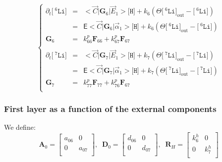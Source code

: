 \documentclass[aps,onecolumn,11pt]{revtex4}
\newcommand{\mychem}[1]{\mathtt{#1}}
\newcommand{\myconc}[1]{\big[#1\big]}
\newcommand{\spLi}[1]{{\!~^{#1}\mychem{Li}}}
\newcommand{\Li}[1]{\myconc{\spLi{#1}}}
\newcommand{\spproton}{\mychem{H}}
\newcommand{\proton}{\myconc{\spproton}}
\newcommand{\myout}[1]{{#1}_{\mathrm{out}}}
\newcommand{\LiOut}[1]{\myout{\Li{#1}}}
\newcommand{\mymat}[1]{{\bm{#1}}}
\begin{document}
\begin{equation}
\left\lbrace
\begin{array}{rcl}
	\partial_t \Li{6} & = & <\vec{C}|\mymat{G}_6|\vec{E}_1> \proton+ k_6\left(\Theta \LiOut{6} - \Li{6}\right)\\
	& = & \mathsf{E} <\vec{C}|\mymat{G}_6|\vec{\alpha}_1> \proton+ k_6\left(\Theta \LiOut{6} - \Li{6}\right)\\
	\mymat{G}_6 &= & k^p_{66} \mymat{F}_{66} + k^p_{67}\mymat{F}_{67} 
	\\
	\\
	\partial_t \Li{7} & = & <\vec{C}|\mymat{G}_7|\vec{E}_1> \proton + k_7\left(\Theta \LiOut{7} - \Li{7}\right)\\
		& = & \mathsf{E} <\vec{C}|\mymat{G}_7|\vec{\alpha}_1> \proton+ k_7\left(\Theta \LiOut{7} - \Li{7}\right)\\
	\mymat{G}_7 & = & k^p_{77} \mymat{F}_{77} + k^p_{76}\mymat{F}_{67} 
	\\
\end{array}
\right.
\end{equation}


\subsubsection{First layer as a function of the external components}
We define:
\begin{equation}
\mymat{A}_0 =\begin{bmatrix}
a_{06} & 0 \\
0 & a_{07} \\
\end{bmatrix},\;\;
\mymat{D}_0 = 
\begin{bmatrix}
d_{06} & 0 \\
0 & d_{07} \\
\end{bmatrix},\;\;
\mymat{R}_H =
\begin{bmatrix}
k^h_6 & 0 \\
0 & k^h_7 \\
\end{bmatrix}
\end{equation}
\end{document}
